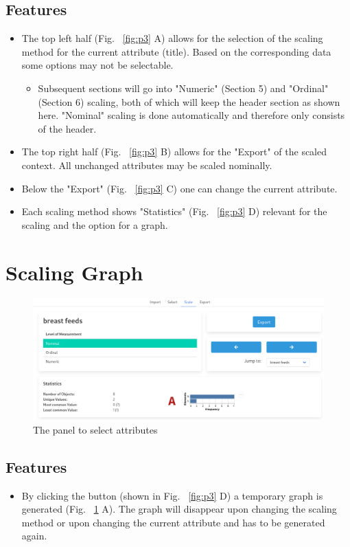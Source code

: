 \documentclass[]{article}
\begin{document}
\subsection{Features}
\begin{itemize}
    \item The top left half (Fig. ~\ref{fig:p3} A) allows for the selection of the scaling method for the current attribute (title). Based on the corresponding data some options may not be selectable.
    \begin{itemize}
        \item Subsequent sections will go into "Numeric" (Section 5) and "Ordinal" (Section 6) scaling, both of which will keep the header section as shown here. "Nominal" scaling is done automatically and therefore only consists of the header.
    \end{itemize}
    \item The top right half (Fig. ~\ref{fig:p3} B) allows for the "Export" of the scaled context. All unchanged attributes may be scaled nominally.
    \item Below the "Export" (Fig. ~\ref{fig:p3} C) one can change the current attribute.
    \item Each scaling method shows "Statistics" (Fig. ~\ref{fig:p3} D) relevant for the scaling and the option for a graph.
\end{itemize}

\section{Scaling Graph}
\begin{figure}[H]
	\includegraphics[width=\linewidth]{images/nominal_graph.png}
	\caption{The panel to select attributes}
	\label{fig:p4}
\end{figure}
\subsection{Features}
\begin{itemize}
    \item By clicking the button (shown in Fig. ~\ref{fig:p3} D)  a temporary graph is generated (Fig. ~\ref{fig:p4} A). The graph will disappear upon changing the scaling method or upon changing the current attribute and has to be generated again.
\end{itemize}
\end{document}
